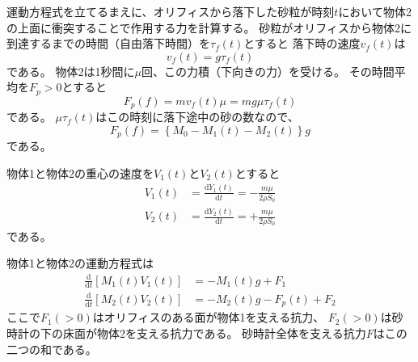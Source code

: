 \documentclass[]{article}
\begin{document}
運動方程式を立てるまえに、オリフィスから落下した砂粒が時刻$t$において物体2の上面に衝突することで作用する力を計算する。
砂粒がオリフィスから物体2に到達するまでの時間（自由落下時間）を$\tau_f(t)$とすると
落下時の速度$v_f(t)$は
\begin{equation} \label{250703161618} 
   v_f(t) = g\tau_f(t)
\end{equation}
である。
物体2は1秒間に$\mu$回、この力積（下向きの力）を受ける。
その時間平均を$F_p>0$とすると
\begin{equation} \label{250703161334} 
  F_p(f)  = m v_f(t) \mu = m g \mu \tau_f(t)
\end{equation}
である。
$\mu\tau_f(t)$はこの時刻に落下途中の砂の数なので、
\begin{equation} \label{250703172127} 
   F_p(f) = \left\{M_0-M_1(t) -M_2(t)\right\} g
\end{equation}
である。




物体1と物体2の重心の速度を$V_1(t)$と$V_2(t)$とすると
\begin{align}
   V_1(t) &= \frac{\mathrm{d} Y_1(t)}{\mathrm{d} t} = - \frac{m \mu }{2\rho S_0}  \label{250703154817a} \\
   V_2(t) &= \frac{\mathrm{d} Y_2(t)}{\mathrm{d} t} = + \frac{m \mu }{2\rho S_0}   \label{250703154817b} 
\end{align}
である。




物体1と物体2の運動方程式は
\begin{align}
   \frac{\mathrm{d} }{\mathrm{d} t} \left[
   									M_1(t) V_1(t)
   								\right] &=   - M_1(t) g + F_1\label{250703155015a} \\
   \frac{\mathrm{d} }{\mathrm{d} t} \left[
   									M_2(t) V_2(t)
   								\right]  &=  - M_2(t) g -F_p(t)+ F_2 \label{250703155015b} 
\end{align}
ここで$F_1 (>0)$はオリフィスのある面が物体1を支える抗力、
$F_2 (>0)$は砂時計の下の床面が物体2を支える抗力である。
砂時計全体を支える抗力$F$はこの二つの和である。
\end{document}
